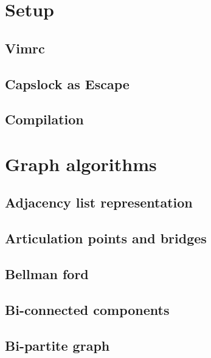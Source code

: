 \section{Setup}
\subsection{Vimrc}
\raggedbottom
\hrulefill
\subsection{Capslock as Escape}
\raggedbottom
\hrulefill
\subsection{Compilation}
\raggedbottom
\hrulefill


\section{Graph algorithms}
\subsection{Adjacency list representation}
\raggedbottom
\hrulefill
\subsection{Articulation points and bridges}
\raggedbottom
\hrulefill
\subsection{Bellman ford}
\raggedbottom
\hrulefill
\subsection{Bi-connected components}
\raggedbottom
\hrulefill
\subsection{Bi-partite graph}
\raggedbottom
\hrulefill
